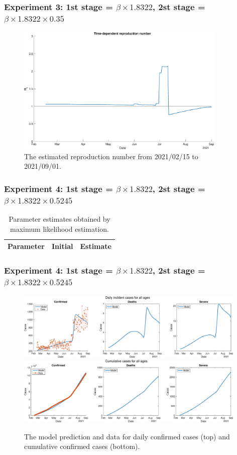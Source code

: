 \documentclass[aspectratio=169, 9pt, xcolor=dvipsnames]{beamer}
\begin{document}
	\begin{frame}\frametitle{Experiment 3: 1st stage = $\beta \times 1.8322$, 2st stage = $\beta \times 1.8322 \times 0.35$}
	    \begin{figure}
	    	\centering
	    	\includegraphics[width=10cm]{../results/estimate_sd_1st_1_2nd_3/rep_num.eps}
	    	\caption{The estimated reproduction number from 2021/02/15 to 2021/09/01.}
	    \end{figure}
	\end{frame}

	\begin{frame}\frametitle{Experiment 4: 1st stage = $\beta \times 1.8322$, 2st stage = $\beta \times 1.8322 \times 0.5245$}
	    \begin{table}
	    	\begin{tabular}{crr}
	    		\toprule
	    		\textbf{Parameter} & \textbf{Initial} & \textbf{Estimate} \\
	    		\midrule
	    		
	    		\bottomrule
	    	\end{tabular}
	    	\caption{Parameter estimates obtained by maximum likelihood estimation.}
	    \end{table}
	\end{frame}

	\begin{frame}\frametitle{Experiment 4: 1st stage = $\beta \times 1.8322$, 2st stage = $\beta \times 1.8322 \times 0.5245$}
	    \begin{figure}
	    	\centering
	    	\includegraphics[width=11cm]{../results/estimate_sd_1st_1_2nd_4/daily_all_age.eps}
	    	\includegraphics[width=11cm]{../results/estimate_sd_1st_1_2nd_4/cumul_all_age.eps}
	    	\caption{The model prediction and data for daily confirmed cases (top) and cumulative confirmed cases (bottom).}
	    \end{figure}
	\end{frame}
\end{document}
